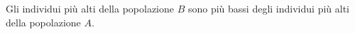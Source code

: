Gli individui più alti della popolazione $B$ sono più bassi 
degli individui più alti della popolazione $A$. 